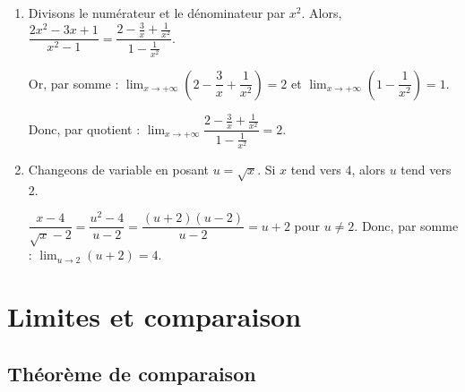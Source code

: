 \documentclass{cornouaille}
\begin{document}
\begin{methode}
\begin{enumerate}
\item Divisons le numérateur et le dénominateur par $x^2$. Alors,
  $\dfrac{2x^2-3x+1}{x^2-1}=
  \dfrac{2-\tfrac{3}{x}+\tfrac{1}{x^2}}{1-\tfrac{1}{x^2}}$.\par
  Or, par somme :
  $\lim_{x\to+\infty}\left(2-\dfrac{3}{x}+\dfrac{1}{x^2}\right)=2$
  et
  $\lim_{x\to+\infty}\left(1-\dfrac{1}{x^2}\right)=1$.



Donc, par quotient : $\lim_{x\to+\infty}\dfrac{2-\tfrac{3}{x}+\tfrac{1}{x^2}}{1-\tfrac{1}{x^2}}=2$.
  \item Changeons de variable en posant $u=\sqrt x$. Si $x$ tend vers $4$, alors $u$ tend vers $2$.\par
  $\dfrac{x-4}{\sqrt x-2}=\dfrac{u^2-4}{u-2}=\dfrac{(u+2)(u-2)}{u-2}=u+2$ pour $u\neq2$. Donc, par somme : $\lim_{u\to2}(u+2)=4$.
  \end{enumerate}
\end{methode}

\section{Limites et comparaison}

\subsection{Théorème de comparaison}
\end{document}
